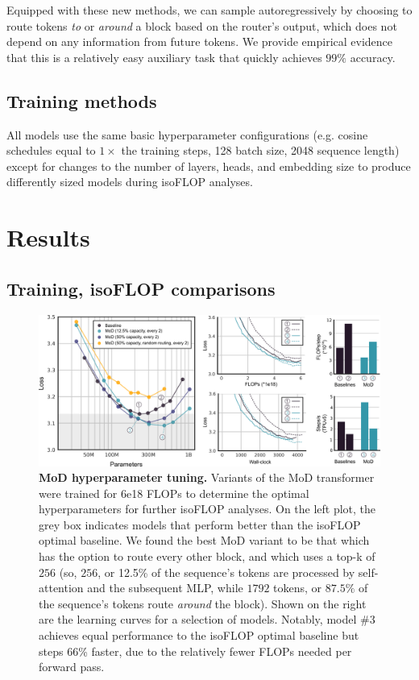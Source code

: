 \documentclass[11pt, a4paper, onecolumn, logo, copyright]{googledeepmind}
\begin{document}
Equipped with these new methods, we can sample autoregressively by choosing to route tokens \textit{to} or \textit{around} a block based on the router's output, which does not depend on any information from future tokens. We provide empirical evidence that this is a relatively easy auxiliary task that quickly achieves $99\%$ accuracy.

\subsection{Training methods}
All models use the same basic hyperparameter configurations (e.g. cosine schedules equal to $1 \times$ the training steps, 128 batch size, 2048 sequence length) except for changes to the number of layers, heads, and embedding size to produce differently sized models during isoFLOP analyses.  

\section{Results}
\subsection{Training, isoFLOP comparisons}
\begin{figure}[h]
    \centering
    \includegraphics[width=\textwidth]{results-1.png}
    \caption{\textbf{MoD hyperparameter tuning.} Variants of the MoD transformer were trained for 6e18 FLOPs to determine the optimal hyperparameters for further isoFLOP analyses. On the left plot, the grey box indicates models that perform better than the isoFLOP optimal baseline. We found the best MoD variant to be that which has the option to route every other block, and which uses a top-k of $256$ (so, $256$, or 12.5\% of the sequence's tokens are processed by self-attention and the subsequent MLP, while $1792$ tokens, or $87.5\%$ of the sequence's tokens route \emph{around} the block). Shown on the right are the learning curves for a selection of models. Notably, model \#3 achieves equal performance to the isoFLOP optimal baseline but steps 66\% faster, due to the relatively fewer FLOPs needed per forward pass.}
    \label{fig:mod-learning-curve}
\end{figure}
\end{document}
